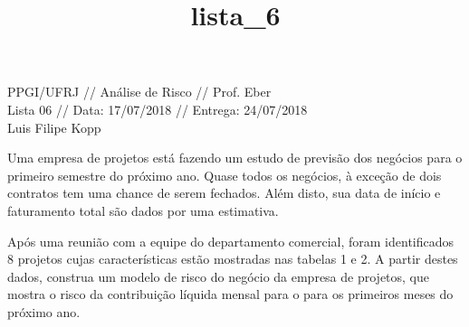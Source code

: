 \documentclass[11pt]{article}
\title{lista\_6}
\begin{document}
    
    
    \maketitle
    
    

    
    PPGI/UFRJ // Análise de Risco // Prof. Eber\\
Lista 06 // Data: 17/07/2018 // Entrega: 24/07/2018\\
Luis Filipe Kopp

    Uma empresa de projetos está fazendo um estudo de previsão dos negócios
para o primeiro semestre do próximo ano. Quase todos os negócios, à
exceção de dois contratos tem uma chance de serem fechados. Além disto,
sua data de início e faturamento total são dados por uma estimativa.

Após uma reunião com a equipe do departamento comercial, foram
identificados 8 projetos cujas características estão mostradas nas
tabelas 1 e 2. A partir destes dados, construa um modelo de risco do
negócio da empresa de projetos, que mostra o risco da contribuição
líquida mensal para o para os primeiros meses do próximo ano.
\end{document}
